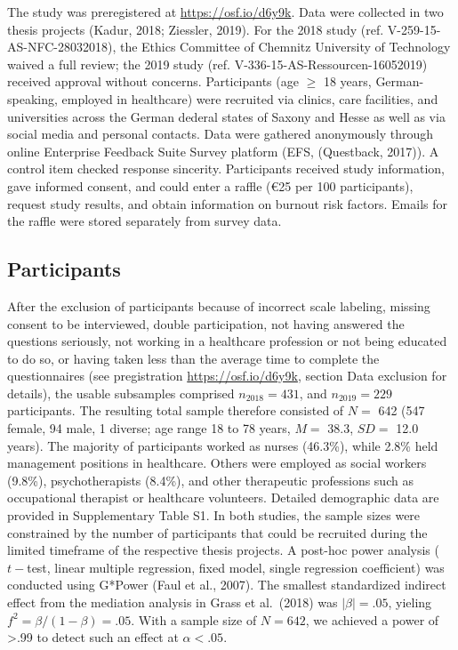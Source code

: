 \documentclass[
  man]{apa6}
\begin{document}
The study was preregistered at \url{https://osf.io/d6y9k}. Data were collected in two thesis projects (Kadur, 2018; Ziessler, 2019). For the 2018 study (ref. V-259-15-AS-NFC-28032018), the Ethics Committee of Chemnitz University of Technology waived a full review; the 2019 study (ref. V-336-15-AS-Ressourcen-16052019) received approval without concerns. Participants (age \(\ge\) 18 years, German-speaking, employed in healthcare) were recruited via clinics, care facilities, and universities across the German dederal states of Saxony and Hesse as well as via social media and personal contacts. Data were gathered anonymously through online Enterprise Feedback Suite Survey platform (EFS, (Questback, 2017)). A control item checked response sincerity. Participants received study information, gave informed consent, and could enter a raffle (€25 per 100 participants), request study results, and obtain information on burnout risk factors. Emails for the raffle were stored separately from survey data.

\subsection{Participants}\label{participants}

After the exclusion of participants because of incorrect scale labeling, missing consent to be interviewed, double participation, not having answered the questions seriously, not working in a healthcare profession or not being educated to do so, or having taken less than the average time to complete the questionnaires (see pregistration \url{https://osf.io/d6y9k}, section Data exclusion for details), the usable subsamples comprised \(n_{2018}=431\), and \(n_{2019}=229\) participants. The resulting total sample therefore consisted of \(N=\) 642 (547 female, 94 male, 1 diverse; age range 18 to 78 years, \(M=\) 38.3, \(SD=\) 12.0 years).
The majority of participants worked as nurses (46.3\%), while 2.8\% held management positions in healthcare.
Others were employed as social workers (9.8\%), psychotherapists (8.4\%), and other therapeutic professions such as occupational therapist or healthcare volunteers.
Detailed demographic data are provided in Supplementary Table S1.
In both studies, the sample sizes were constrained by the number of participants that could be recruited during the limited timeframe of the respective thesis projects. A post-hoc power analysis (\(t-\)test, linear multiple regression, fixed model, single regression coefficient) was conducted using G*Power (Faul et al., 2007). The smallest standardized indirect effect from the mediation analysis in Grass et al.~(2018) was \(|\beta|=.05\), yieling \(f^2=\beta/(1-\beta)=.05\). With a sample size of \(N=642\), we achieved a power of \textgreater.99 to detect such an effect at \(\alpha<.05\).
\end{document}
